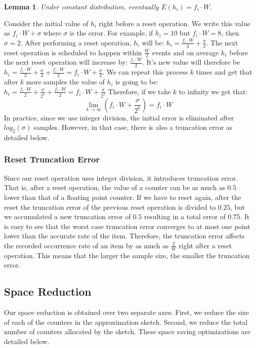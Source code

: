 \documentclass[10pt,a4paper]{article}
\newtheorem{lemma}[theorem]{Lemma}
\newenvironment{proof}[1][IEEEproof]{\begin{trivlist}
\item[\hskip \labelsep {\bfseries #1}]}{\end{trivlist}}
\begin{document}
\begin{lemma}
	Under constant distribution, eventually $E(h_i)= f_i \cdot W$.
\end{lemma}
\begin{proof}
	Consider the initial value of $h_i$ right before a reset operation.
    We write this value as $f_i\cdot W + \sigma$ where $\sigma$ is the error.
    For example, if $h_i= 10$ but $f_i\cdot W = 8$, then $\sigma = 2$.
    After performing a reset operation, $h_i$ will be: $h_i = \frac{f_i\cdot W}{2} +\frac{\sigma}{2}$.
    The next reset operation is scheduled to happen within $\frac{W}{2}$ events and on average $h_i$ before the next reset operation will increase by: $\frac{f_i\cdot W}{2}$.
    It's new value will therefore be $h_i = \frac{f_i\cdot W}{2} +\frac{\sigma}{2}+  \frac{f_i\cdot W}{2}  = f_i\cdot W +\frac{\sigma}{2}$.
	We can repeat this process $k$ times and get that after $k$ more samples the value of $h_i$ is going to be:
	$h_i = \frac{f_i\cdot W}{2} +\frac{\sigma}{2^k}+  \frac{f_i\cdot W}{2}  = f_i\cdot W +\frac{\sigma}{2^k}$
	Therefore, if we take $k$ to infinity we get that:
	$${\lim _{k \to \infty }} (f_i\cdot W +\frac{\sigma}{2^k}) = f_i\cdot W$$
	In practice, since we use integer division, the initial error is eliminated after $log_2(\sigma)$ samples.
    However, in that case, there is also a truncation error as detailed below.
\end{proof}

\subsubsection{Reset Truncation Error}

Since our reset operation uses integer division, it introduces truncation error.
That is, after a reset operation, the value of a counter can be as much as $0.5$ lower than that of a floating point counter.
If we have to reset again, after the reset the truncation error of the previous reset operation is divided to $0.25$, but we accumulated a new truncation error of $0.5$ resulting in a total error of $0.75$.
It is easy to see that the worst case truncation error converges to at most one point lower than the accurate rate of the item.
Therefore, the truncation error affects the recorded occurrence rate of an item by as much as $\frac{2}{W}$ right after a reset operation.
This means that the larger the sample size, the smaller the truncation error.

\subsection{Space Reduction}
Our space reduction is obtained over two separate axes: First, we reduce the size of each of the counters in the approximation sketch.
Second, we reduce the total number of counters allocated by the sketch. These space saving optimizations are detailed below.
\end{document}
